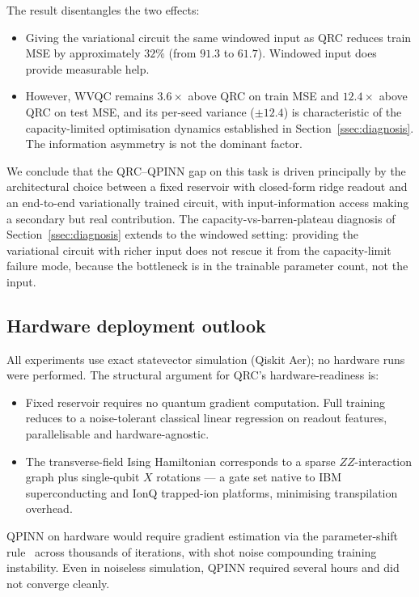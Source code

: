 \documentclass[11pt,a4paper]{article}
\begin{document}
The result disentangles the two effects:
\begin{itemize}
  \item Giving the variational circuit the same windowed input as
        QRC reduces train MSE by approximately $32\%$ (from $91.3$
        to $61.7$). Windowed input does provide measurable help.
  \item However, WVQC remains $3.6\times$ above QRC on train MSE
        and $12.4\times$ above QRC on test MSE, and its per-seed
        variance ($\pm 12.4$) is characteristic of the
        capacity-limited optimisation dynamics established in
        Section~\ref{ssec:diagnosis}. The information asymmetry is
        not the dominant factor.
\end{itemize}

We conclude that the QRC--QPINN gap on this task is driven
principally by the architectural choice between a fixed reservoir
with closed-form ridge readout and an end-to-end variationally
trained circuit, with input-information access making a secondary
but real contribution. The capacity-vs-barren-plateau diagnosis of
Section~\ref{ssec:diagnosis} extends to the windowed setting:
providing the variational circuit with richer input does not rescue
it from the capacity-limit failure mode, because the bottleneck is
in the trainable parameter count, not the input.

\subsection{Hardware deployment outlook}

All experiments use exact statevector simulation (Qiskit Aer); no
hardware runs were performed. The structural argument for QRC's
hardware-readiness is:
\begin{itemize}
  \item Fixed reservoir requires no quantum gradient computation.
        Full training reduces to a noise-tolerant classical linear
        regression on readout features, parallelisable and
        hardware-agnostic.
  \item The transverse-field Ising Hamiltonian corresponds to a
        sparse $ZZ$-interaction graph plus single-qubit $X$ rotations
        --- a gate set native to IBM superconducting and IonQ
        trapped-ion platforms, minimising transpilation overhead.
\end{itemize}
QPINN on hardware would require gradient estimation via the
parameter-shift rule~\cite{mitarai2018quantum} across thousands of
iterations, with shot noise compounding training instability. Even
in noiseless simulation, QPINN required several hours and did not
converge cleanly.
\end{document}
